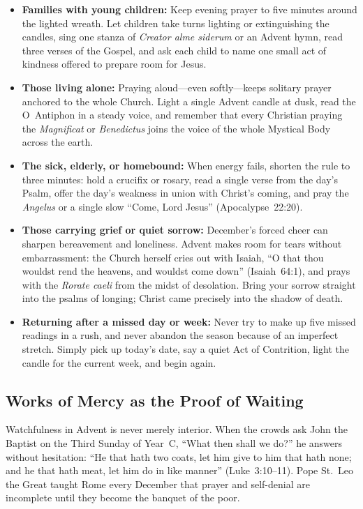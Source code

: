 \begin{itemize}
  \item \textbf{Families with young children:} Keep evening prayer to five minutes around the lighted wreath. Let children take turns lighting or extinguishing the candles, sing one stanza of \textit{Creator alme siderum} or an Advent hymn, read three verses of the Gospel, and ask each child to name one small act of kindness offered to prepare room for Jesus.
  \item \textbf{Those living alone:} Praying aloud---even softly---keeps solitary prayer anchored to the whole Church. Light a single Advent candle at dusk, read the O~Antiphon in a steady voice, and remember that every Christian praying the \textit{Magnificat} or \textit{Benedictus} joins the voice of the whole Mystical Body across the earth.
  \item \textbf{The sick, elderly, or homebound:} When energy fails, shorten the rule to three minutes: hold a crucifix or rosary, read a single verse from the day's Psalm, offer the day's weakness in union with Christ's coming, and pray the \textit{Angelus} or a single slow ``Come, Lord Jesus'' (Apocalypse~22:20).
  \item \textbf{Those carrying grief or quiet sorrow:} December's forced cheer can sharpen bereavement and loneliness. Advent makes room for tears without embarrassment: the Church herself cries out with Isaiah, ``O that thou wouldst rend the heavens, and wouldst come down'' (Isaiah~64:1), and prays with the \textit{Rorate caeli} from the midst of desolation. Bring your sorrow straight into the psalms of longing; Christ came precisely into the shadow of death.
  \item \textbf{Returning after a missed day or week:} Never try to make up five missed readings in a rush, and never abandon the season because of an imperfect stretch. Simply pick up today's date, say a quiet Act of Contrition, light the candle for the current week, and begin again.
\end{itemize}

\subsection{Works of Mercy as the Proof of Waiting}

Watchfulness in Advent is never merely interior. When the crowds ask John the Baptist on the Third Sunday of Year~C, ``What then shall we do?'' he answers without hesitation: ``He that hath two coats, let him give to him that hath none; and he that hath meat, let him do in like manner'' (Luke~3:10--11). Pope St.~Leo the Great taught Rome every December that prayer and self-denial are incomplete until they become the banquet of the poor.

